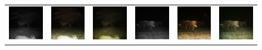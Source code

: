 \begin{figure}[htp!]
\begin{tabularx}{\textwidth}{Y Y Y !{\space} Y Y Y}
        \includegraphics{gfx/diffusion-sampling-intensity-qual/nir_S2_B06_R1_PICT0387.jpg} & \includegraphics{gfx/diffusion-sampling-intensity-qual/cyclegan_S2_B06_R1_PICT0387_fake.png} & \includegraphics{gfx/diffusion-sampling-intensity-qual/diffusion_S2_B06_R1_PICT0387.png} & \includegraphics{gfx/diffusion-sampling-intensity-qual/nir_S2_B06_R3_PICT1364.jpg} & \includegraphics{gfx/diffusion-sampling-intensity-qual/cyclegan_S2_B06_R3_PICT1364_fake.png} & \includegraphics{gfx/diffusion-sampling-intensity-qual/diffusion_S2_B06_R3_PICT1364.png} \\

\end{tabularx}
\end{figure}
